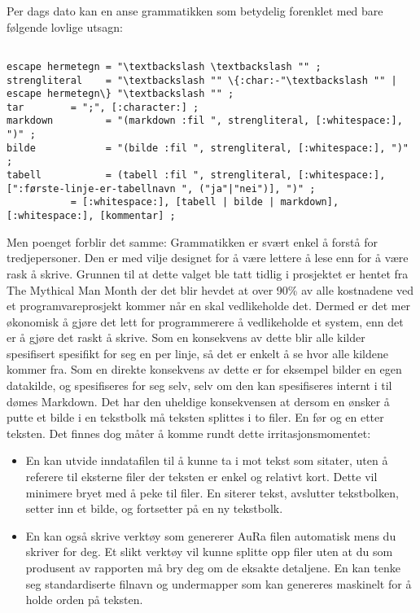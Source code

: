 \documentclass[11pt]{article}
\begin{document}
Per dags dato kan en anse grammatikken som betydelig forenklet med bare følgende lovlige utsagn:

\begin{lstlisting}

escape hermetegn = "\textbackslash \textbackslash "" ;
strengliteral    = "\textbackslash "" \{:char:-"\textbackslash "" | escape hermetegn\} "\textbackslash "" ;
tar        = ";", [:character:] ;
markdown         = "(markdown :fil ", strengliteral, [:whitespace:], ")" ;
bilde            = "(bilde :fil ", strengliteral, [:whitespace:], ")" ;
tabell           = (tabell :fil ", strengliteral, [:whitespace:], [":første-linje-er-tabellnavn ", ("ja"|"nei")], ")" ;
           = [:whitespace:], [tabell | bilde | markdown], [:whitespace:], [kommentar] ;
\end{lstlisting}

Men poenget forblir det samme: Grammatikken er svært enkel å forstå for tredjepersoner. Den er med vilje designet for å være lettere å lese enn for å være rask å skrive. 
Grunnen til at dette valget ble tatt tidlig i prosjektet er hentet fra The Mythical Man Month\cite{MythicalManMonth} der det blir hevdet at over 90\% av alle kostnadene ved et programvareprosjekt kommer når en skal vedlikeholde det. Dermed er det mer økonomisk å gjøre det lett for programmerere å vedlikeholde et system, enn det er å gjøre det raskt å skrive. Som en konsekvens av dette blir alle kilder spesifisert spesifikt for seg en per linje, så det er enkelt å se hvor alle kildene kommer fra. Som en direkte konsekvens av dette er for eksempel bilder en egen datakilde, og spesifiseres for seg selv, selv om den kan spesifiseres internt i til dømes Markdown. Det har den uheldige konsekvensen at dersom en ønsker å putte et bilde i en tekstbolk må teksten splittes i to filer. En før og en etter teksten. Det finnes dog måter å komme rundt dette irritasjonsmomentet:




\begin{itemize}
\item En kan utvide inndatafilen til å kunne ta i mot tekst som sitater, uten å referere til eksterne filer der teksten er enkel og relativt kort. Dette vil minimere bryet med å peke til filer. En siterer tekst, avslutter tekstbolken, setter inn et bilde, og fortsetter på en ny tekstbolk.
\item En kan også skrive verktøy som genererer AuRa filen automatisk mens du skriver for deg. Et slikt verktøy vil kunne splitte opp filer uten at du som produsent av rapporten må bry deg om de eksakte detaljene. En kan tenke seg standardiserte filnavn og undermapper som kan genereres maskinelt for å holde orden på teksten.
\end{itemize}
\end{document}
